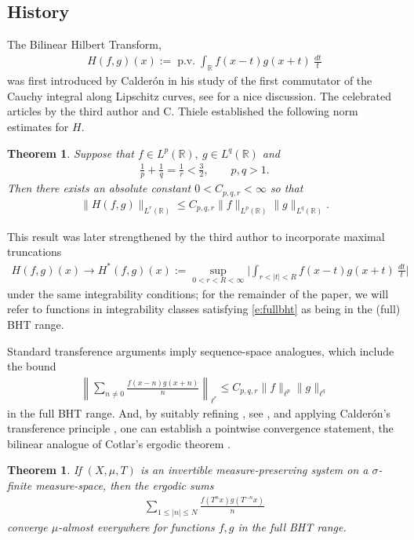 \documentclass[12pt,leqno]{amsart}
\numberwithin{equation}{section}
\newtheorem{theorem}[equation]{Theorem}
\theoremstyle{definition}
\theoremstyle{plain}
\begin{document}
	\subsection{History}
	The Bilinear Hilbert Transform,
	\begin{align}
		H(f,g)(x) :=  \operatorname{p.v.} \int_{\mathbb{R}} f(x-t) g(x+t) \ \frac{dt}{t}
	\end{align}
	was first introduced by Calder\'{o}n in his study of the first commutator of the Cauchy integral along Lipschitz curves, see \cite{MSLipschitz} for a nice discussion. The celebrated articles by the third author and C. Thiele \cite{LT1999,LT2000} established the following norm estimates for $H$.
	\begin{theorem}\label{t:BHT}
		Suppose that $f \in L^p(\mathbb{R}), \ g \in L^q(\mathbb{R})$ and 
		\begin{align}\label{e:fullbht} \frac{1}{p} + \frac{1}{q} = \frac{1}{r} < \frac{3}{2}, \qquad p,q > 1.\end{align}
		Then there exists an absolute constant $0 < C_{p,q,r} < \infty$ so that
		\begin{align}
			\| H(f,g) \|_{L^r(\mathbb{R})} \leq C_{p,q,r} \|f \|_{L^p(\mathbb{R})} \| g \|_{L^q(\mathbb{R})}.
		\end{align}
	\end{theorem}
	This result was later strengthened by the third author \cite{Lacey2000} to incorporate maximal truncations
	\begin{align}
		H(f,g)(x) \longrightarrow H^*(f,g)(x) := \sup_{0<r<R<\infty} \big| \int_{r < |t| < R} f(x-t) g(x+t) \ \frac{dt}{t} \big|
	\end{align}
	under the same integrability conditions; for the remainder of the paper, we will refer to functions in integrability classes satisfying \eqref{e:fullbht} as being in the (full) BHT range.
	
	Standard transference arguments imply sequence-space analogues, which include the bound
	\begin{align}
		\left  \| \sum_{n \neq 0} \frac{f(x-n) g(x+n)}{n} \right\|_{\ell^r} \leq C_{p,q,r} \|f \|_{\ell^p} \| g \|_{\ell^q}
	\end{align}
	in the full BHT range. And, by suitably refining \cite{Lacey2000}, see \cite{BeckerDurcik26,Demeter07,DoOberlinPalsson17}, and applying Calder\'{o}n's transference principle \cite{Calderon1968}, one can establish a pointwise convergence statement, the bilinear analogue of Cotlar's ergodic theorem \cite{Cotlar1955}.
	\begin{theorem}\label{t:BILINEARCOTLAR}
		If $(X,\mu,T)$ is an invertible measure-preserving system on a $\sigma$-finite measure-space, then the ergodic sums
		\begin{align}
			\sum_{1 \leq |n| \leq N} \frac{f(T^n x) g(T^{-n} x)}{n}
		\end{align}
		converge $\mu$-almost everywhere for functions $f,g$ in the full BHT range.
	\end{theorem}
	
\end{document}
